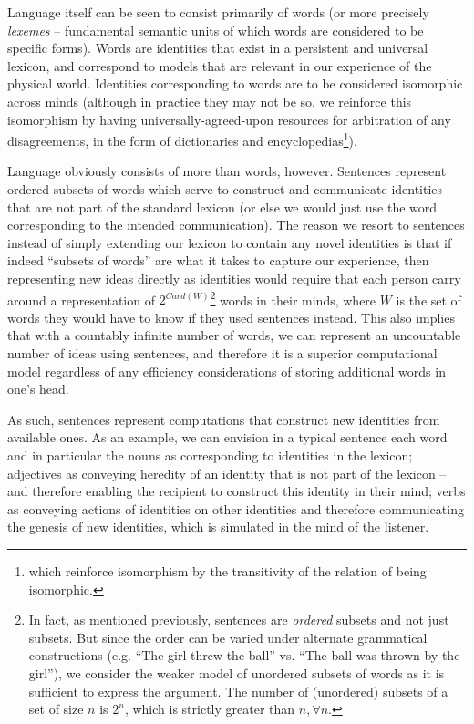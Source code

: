 \documentclass[pra,twocolumn,groupedaddress,10pt]{revtex4}
\theoremstyle{definition}
\begin{document}

Language itself can be seen to consist primarily of words (or more precisely \textit{lexemes} -- fundamental semantic units of which words are considered to be specific forms). Words are identities that exist in a persistent and universal lexicon, and correspond to models that are relevant in our experience of the physical world. Identities corresponding to words are to be considered isomorphic across minds (although in practice they may not be so, we reinforce this isomorphism by having universally-agreed-upon resources for arbitration of any disagreements, in the form of dictionaries and encyclopedias\footnote{which reinforce isomorphism by the transitivity of the relation of being isomorphic.}).

Language obviously consists of more than words, however. Sentences represent ordered subsets of words which serve to construct and communicate identities that are not part of the standard lexicon (or else we would just use the word corresponding to the intended communication). The reason we resort to sentences instead of simply extending our lexicon to contain any novel identities is that if indeed ``subsets of words'' are what it takes to capture our experience, then representing new ideas directly as identities would require that each person carry around a representation of $2^{Card(W)}$\footnote{In fact, as mentioned previously, sentences are \textit{ordered} subsets and not just subsets. But since the order can be varied under alternate grammatical constructions (e.g. ``The girl threw the ball'' vs. ``The ball was thrown by the girl''), we consider the weaker model of unordered subsets of words as it is sufficient to express the argument. The number of (unordered) subsets of a set of size $n$ is $2^{n}$, which is strictly greater than $n, \forall n$.} words in their minds, where $W$ is the set of words they would have to know if they used sentences instead. This also implies that with a countably infinite number of words, we can represent an uncountable number of ideas using sentences, and therefore it is a superior computational model regardless of any efficiency considerations of storing additional words in one's head.

As such, sentences represent computations that construct new identities from available ones. As an example, we can envision in a typical sentence each word and in particular the nouns as corresponding to identities in the lexicon; adjectives as conveying heredity of an identity that is not part of the lexicon -- and therefore enabling the recipient to construct this identity in their mind; verbs as conveying actions of identities on other identities and therefore communicating the genesis of new identities, which is simulated in the mind of the listener.
\end{document}
